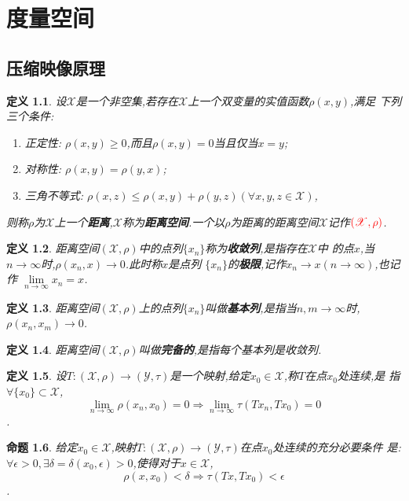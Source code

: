 \documentclass{ctexrep}
\newtheorem{defn}{定义}[section]
\newtheorem{prop}[defn]{命题}
\newcommand{\X}{\mathscr{X}}
\newcommand{\Xp}{(\mathscr{X},\rho)}
\newcommand{\Yt}{(\mathscr{Y},\tau)}
\begin{document}
\chapter{度量空间}

\section{压缩映像原理}
\begin{defn}
设$\X$是一个非空集,若存在$\X$上一个双变量的实值函数$\rho(x,y)$,满足
下列三个条件:
\renewcommand{\labelenumi}{(\theenumi)}
\begin{enumerate}
\item 正定性: $\rho(x,y)\geq 0$,而且$\rho(x,y) = 0$当且仅当$x = y$;
\item 对称性: $\rho(x,y) = \rho(y,x)$;
\item 三角不等式: $\rho(x,z)\leq \rho(x,y) + \rho(y,z)(\forall x,y,z \in
  \X)$,
\end{enumerate}
则称$\rho$为$\X$上一个\textbf{距离},$\X$称为\textbf{距离空间}.一个以$\rho$为距离的距离空间$\X$记作$\textcolor{red}{\Xp}$.
\end{defn}

\begin{defn}
距离空间$\Xp$中的点列$\{x_n\}$称为\textbf{收敛列},是指存在$\X$中
的点$x$,当$n \rightarrow \infty$时,$\rho(x_n,x) \rightarrow 0$.此时称$x$是点列
$\{x_n\}$的\textbf{极限},记作$x_n \rightarrow x (n \rightarrow \infty)$,也记作
$\lim\limits_{n\rightarrow \infty}{x_n} = x$.
\end{defn}

\begin{defn}
距离空间$\Xp$上的点列$\{x_n\}$叫做\textbf{基本列},是指当$n,m \rightarrow
\infty$时,$\rho(x_n,x_m)\rightarrow 0$.
\end{defn}

\begin{defn}
距离空间$\Xp$叫做\textbf{完备的},是指每个基本列是收敛列.
\end{defn}

\begin{defn}
设$T : \Xp \to \Yt$是一个映射,给定$x_0 \in \X$,称$T$在点$x_0$处连续,是
指$\forall \{x_0\} \subset \X$,
\[
\lim_{n\rightarrow \infty}{\rho(x_n,x_0) = 0} \Rightarrow
\lim_{n\rightarrow \infty}{\tau(Tx_n,Tx_0) = 0}
\].
\end{defn}

\begin{prop}
给定$x_0 \in \X$,映射$T : \Xp \to \Yt$在点$x_0$处连续的充分必要条件
是:$\forall \epsilon > 0, \exists \delta = \delta(x_0,\epsilon)
> 0$,使得对于$x \in \X$,
\[
\rho(x,x_0) < \delta \Rightarrow \tau(Tx,Tx_0) < \epsilon
\].
\end{prop}
\end{document}
